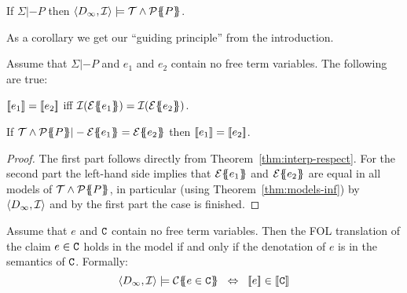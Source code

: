 \begin{theorem}\label{thm:models-inf}
If $\Sigma |- P$ then $\langle D_{\infty},{\cal I}\rangle \models {\cal T} \land {\cal P}\{\!\!\{P\}\!\!\}$.
\end{theorem}
As a corollary we get our ``guiding principle'' from the introduction.
\begin{corollary}\label{cor:guiding-principle}
Assume that $\Sigma |- P$ and $e_1$ and $e_2$ contain no free term variables. The following
are true:
\begin{itemize*}
  \item $[\![e_1]\!] = [\![e_2]\!]$ iff ${\cal I}(\etrans{}{}{e_1}) = {\cal I}(\etrans{}{}{e_2})$.
  \item If $\Th \land \ptrans{\Sigma}{P} |- \etrans{}{}{e_1} = \etrans{}{}{e_2}$ then $[\![e_1]\!] = [\![e_2]\!]$.
\end{itemize*}
\end{corollary}
\begin{proof} The first part follows directly from Theorem~\ref{thm:interp-respect}.
For the second part the left-hand side implies that ${\cal E}\{\!\!\{e_1\}\!\!\}$ and ${\cal E}\{\!\!\{e_2\}\!\!\}$ are
equal in all models of ${\cal T} \land {\cal P}\{\!\!\{P\}\!\!\}$, in particular (using Theorem~\ref{thm:models-inf})
by $\langle D_{\infty},{\cal I}\rangle$ and by the first part the case is finished.
\end{proof}


\begin{theorem}\label{thm:den-contr-satisfaction} Assume that $e$ and ${\tt C}$ contain no free
term variables. Then the FOL translation of the claim $e \in {\tt C}$ holds in the model
if and only if the denotation of $e$ is in the semantics of ${\tt C}$.  Formally:
$$\langle D_\infty,{\cal I}\rangle \models \ctrans{}{\cdot}{e \in \Ct}
  \;\; \Leftrightarrow \;\; \dbrace{e} \in \dbrace{\Ct}
$$
\end{theorem}


